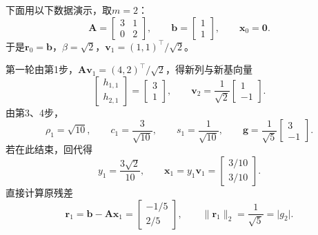 \begin{example}[非对称矩阵上的GMRES]
\label{ex:ls-gmres-nonsymmetric}
下面用以下数据演示，取$m=2$：
\[
 \bm A=\begin{bmatrix}3&1\\0&2\end{bmatrix},\qquad
 \bm b=\begin{bmatrix}1\\1\end{bmatrix},\qquad
 \bm x_0=\bm0 .
\]
于是$\bm r_0=\bm b$，$\beta=\sqrt2$，$\bm v_1=(1,1)^\top/\sqrt2$。

第一轮由第1步，$\bm A\bm v_1=(4,2)^\top/\sqrt2$，得新列与新基向量
\[
 \begin{bmatrix}h_{1,1}\\h_{2,1}\end{bmatrix}=\begin{bmatrix}3\\1\end{bmatrix},\qquad
 \bm v_2=\frac1{\sqrt2}\begin{bmatrix}1\\-1\end{bmatrix}.
\]
由第3、4步，
\[
 \rho_1=\sqrt{10},\qquad c_1=\frac3{\sqrt{10}},\qquad s_1=\frac1{\sqrt{10}},\qquad
 \bm g=\frac1{\sqrt5}\begin{bmatrix}3\\-1\end{bmatrix}.
\]
若在此结束，回代得
\[
 y_1=\frac{3\sqrt2}{10},\qquad \bm x_1=y_1\bm v_1=\begin{bmatrix}3/10\\3/10\end{bmatrix}.
\]
直接计算原残差
\[
 \bm r_1=\bm b-\bm A\bm x_1=\begin{bmatrix}-1/5\\2/5\end{bmatrix},\qquad
 \lVert\bm r_1\rVert_2=\frac1{\sqrt5}=\lvert g_2\rvert .
\]


\end{example}
